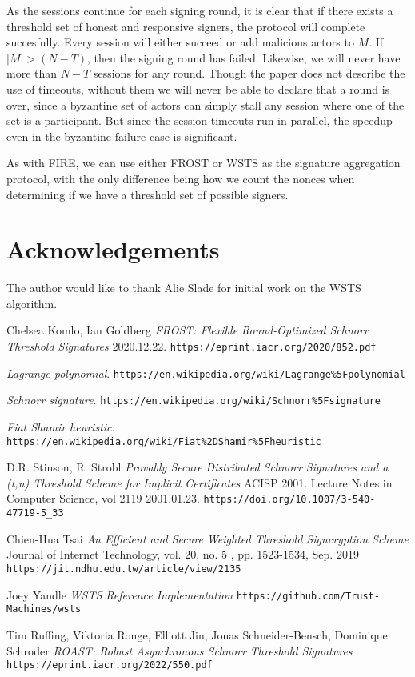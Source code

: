 \documentclass{article}
\begin{document}
As the sessions continue for each signing round, it is clear that if there exists a threshold set of honest and responsive signers, the protocol will complete succesfully.  Every session will either succeed or add malicious actors to $M$.  If $|M| > (N-T)$, then the signing round has failed.  Likewise, we will never have more than $N-T$ sessions for any round.  Though the paper does not describe the use of timeouts, without them we will never be able to declare that a round is over, since a byzantine set of actors can simply stall any session where one of the set is a participant.  But since the session timeouts run in parallel, the speedup even in the byzantine failure case is significant.

As with FIRE, we can use either FROST or WSTS as the signature aggregation protocol, with the only difference being how we count the nonces when determining if we have a threshold set of possible signers.

\newpage
\onecolumn
\section{
  Acknowledgements
}

The author would like to thank Alie Slade for initial work on the WSTS algorithm.

\begin{thebibliography}{7}

  Chelsea Komlo, Ian Goldberg
  \emph{FROST: Flexible Round-Optimized Schnorr Threshold Signatures} 2020.12.22.
  \texttt{https://eprint.iacr.org/2020/852.pdf}

  \emph{Lagrange polynomial}.
  \texttt{https://en.wikipedia.org/wiki/Lagrange\%5Fpolynomial}

  \emph{Schnorr signature}.
  \texttt{https://en.wikipedia.org/wiki/Schnorr\%5Fsignature}

  \emph{Fiat Shamir heuristic}.
  \texttt{https://en.wikipedia.org/wiki/Fiat\%2DShamir\%5Fheuristic}

  D.R. Stinson, R. Strobl
  \emph{Provably Secure Distributed Schnorr Signatures and a (t,n) Threshold Scheme for Implicit Certificates} ACISP 2001. Lecture Notes in Computer Science, vol 2119 2001.01.23.
  \texttt{https://doi.org/10.1007/3-540-47719-5\_33}

  Chien-Hua Tsai
  \emph{An Efficient and Secure Weighted Threshold Signcryption Scheme} Journal of Internet Technology, vol. 20, no. 5 , pp. 1523-1534, Sep. 2019
  \texttt{https://jit.ndhu.edu.tw/article/view/2135}

  Joey Yandle
  \emph{WSTS Reference Implementation}
  \texttt{https://github.com/Trust-Machines/wsts}

  Tim Ruffing, Viktoria Ronge, Elliott Jin, Jonas Schneider-Bensch, Dominique Schroder
  \emph{ROAST: Robust Asynchronous Schnorr Threshold Signatures} 
  \texttt{https://eprint.iacr.org/2022/550.pdf}

\end{thebibliography}
\end{document}
